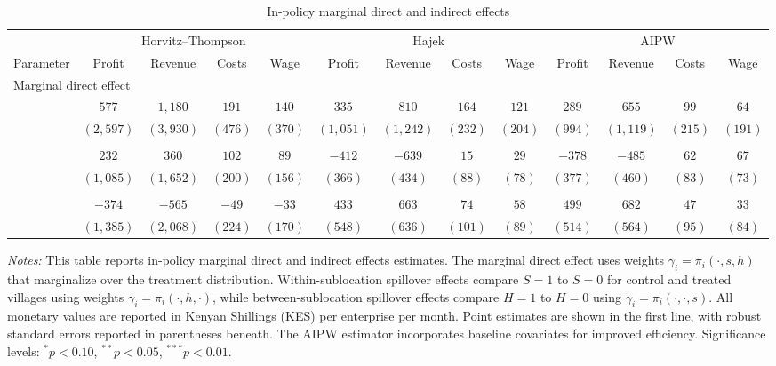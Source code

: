 \documentclass{article}
\newcommand{\pscore}[1]{\pi_{#1}}
\begin{document}
\begin{table}[H]
\centering
\caption{In-policy marginal direct and indirect effects}
\label{tab:spillover_effects}
\footnotesize
\begin{tabular}{lcccccccccccc}
\toprule
& \multicolumn{4}{c}{Horvitz--Thompson} & \multicolumn{4}{c}{Hajek} & \multicolumn{4}{c}{AIPW} \\
\cmidrule(lr){2-5} \cmidrule(lr){6-9} \cmidrule(lr){10-13}
Parameter & Profit & Revenue & Costs & Wage & Profit & Revenue & Costs & Wage & Profit & Revenue & Costs & Wage \\
\midrule
\multicolumn{13}{l}{{Marginal direct effect}} \\
 & $577$ & $1{,}180$ & $191$ & $140$ & $335$ & $810$ & $164$ & $121$ & $289$ & $655$ & $99$ & $64$ \\
 & $(2{,}597)$ & $(3{,}930)$ & $(476)$ & $(370)$ & $(1{,}051)$ & $(1{,}242)$ & $(232)$ & $(204)$ & $(994)$ & $(1{,}119)$ & $(215)$ & $(191)$ \\
\addlinespace
\multicolumn{13}{l}{{Within-sublocation indirect effect}} \\
 & $232$ & $360$ & $102$ & $89$ & $-412$ & $-639$ & $15$ & $29$ & $-378$ & $-485$ & $62$ & $67$ \\
 & $(1{,}085)$ & $(1{,}652)$ & $(200)$ & $(156)$ & $(366)$ & $(434)$ & $(88)$ & $(78)$ & $(377)$ & $(460)$ & $(83)$ & $(73)$ \\
\addlinespace
\multicolumn{13}{l}{{Between-sublocation indirect effect}} \\
 & $-374$ & $-565$ & $-49$ & $-33$ & $433$ & $663$ & $74$ & $58$ & $499$ & $682$ & $47$ & $33$ \\
 & $(1{,}385)$ & $(2{,}068)$ & $(224)$ & $(170)$ & $(548)$ & $(636)$ & $(101)$ & $(89)$ & $(514)$ & $(564)$ & $(95)$ & $(84)$ \\
\bottomrule
\end{tabular}
\begin{minipage}{0.95\textwidth}
\vspace{2mm}
\footnotesize
\textit{Notes:} This table reports in-policy marginal direct and indirect effects estimates. The marginal direct effect uses weights $\gamma_i = \pscore{i}(\cdot,s,h)$ that marginalize over the treatment distribution. Within-sublocation spillover effects compare $S=1$ to $S=0$ for control and treated villages using weights $\gamma_i = \pscore{i}(\cdot,h,\cdot)$, while between-sublocation spillover effects compare $H=1$ to $H=0$ using $\gamma_i = \pscore{i}(\cdot,\cdot,s)$. All monetary values are reported in Kenyan Shillings (KES) per enterprise per month. Point estimates are shown in the first line, with robust standard errors reported in parentheses beneath. The AIPW estimator incorporates baseline covariates for improved efficiency. Significance levels: $^{*}p<0.10$, $^{**}p<0.05$, $^{***}p<0.01$.
\end{minipage}
\end{table}
\end{document}
